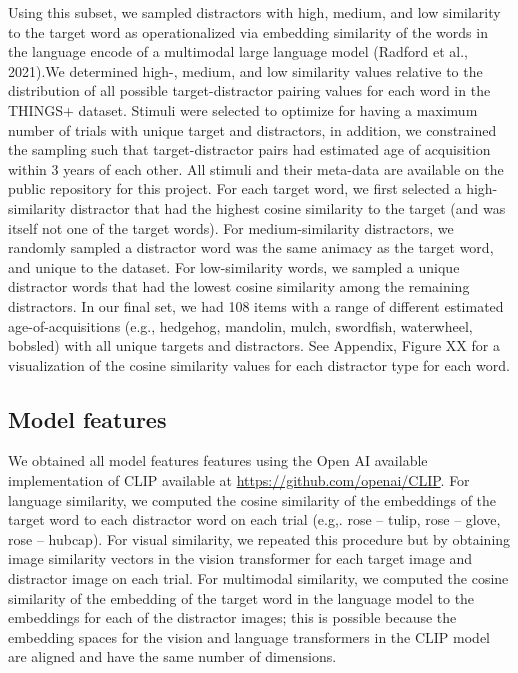 \documentclass[
  man,mask]{apa6}
\begin{document}
Using this subset, we sampled distractors with high, medium, and low similarity to the target word as operationalized via embedding similarity of the words in the language encode of a multimodal large language model (Radford et al., 2021).We determined high-, medium, and low similarity values relative to the distribution of all possible target-distractor pairing values for each word in the THINGS+ dataset. Stimuli were selected to optimize for having a maximum number of trials with unique target and distractors, in addition, we constrained the sampling such that target-distractor pairs had estimated age of acquisition within 3 years of each other. All stimuli and their meta-data are available on the public repository for this project. For each target word, we first selected a high-similarity distractor that had the highest cosine similarity to the target (and was itself not one of the target words). For medium-similarity distractors, we randomly sampled a distractor word was the same animacy as the target word, and unique to the dataset. For low-similarity words, we sampled a unique distractor words that had the lowest cosine similarity among the remaining distractors. In our final set, we had 108 items with a range of different estimated age-of-acquisitions (e.g., hedgehog, mandolin, mulch, swordfish, waterwheel, bobsled) with all unique targets and distractors. See Appendix, Figure XX for a visualization of the cosine similarity values for each distractor type for each word.

\subsection{Model features}\label{model-features}

We obtained all model features features using the Open AI available implementation of CLIP available at \url{https://github.com/openai/CLIP}. For language similarity, we computed the cosine similarity of the embeddings of the target word to each distractor word on each trial (e.g,. rose -- tulip, rose -- glove, rose -- hubcap). For visual similarity, we repeated this procedure but by obtaining image similarity vectors in the vision transformer for each target image and distractor image on each trial. For multimodal similarity, we computed the cosine similarity of the embedding of the target word in the language model to the embeddings for each of the distractor images; this is possible because the embedding spaces for the vision and language transformers in the CLIP model are aligned and have the same number of dimensions.
\end{document}
